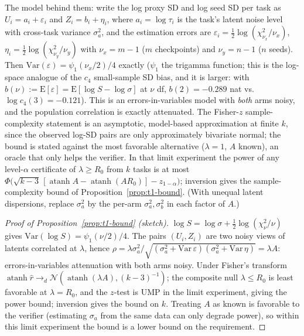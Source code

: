 The model behind
them: write the log proxy SD and log seed SD per task as $U_i = a_i + \varepsilon_i$ and
$Z_i = b_i + \eta_i$, where $a_i = \log \tau_i$ is the
task's latent noise level with cross-task variance $\sigma_a^2$, and the estimation errors are
$\varepsilon_i = \tfrac12\log(\chi^2_{\nu_x}/\nu_x)$, $\eta_i = \tfrac12\log(\chi^2_{\nu_y}/\nu_y)$
with $\nu_x = m-1$ ($m$ checkpoints) and $\nu_y = n-1$ ($n$ seeds). Then
$\mathrm{Var}(\varepsilon) = \psi_1(\nu_x/2)/4$ exactly ($\psi_1$ the trigamma function; this is
the log-space analogue of the $c_4$ small-sample SD bias, and it is larger:
with $b(\nu) := \mathrm{E}[\varepsilon] = \mathrm{E}[\log S - \log \sigma]$ at $\nu$ df, $b(2) = -0.289$ nat vs.\ $\log c_4(3) = -0.121$). This is an errors-in-variables model with
\emph{both} arms noisy, and the population correlation is exactly attenuated. The Fisher-$z$
sample-complexity statement is an asymptotic, model-based approximation at finite $k$, since the
observed log-SD pairs are only approximately bivariate normal; the bound is stated against the
most favorable alternative ($\lambda = 1$, $A$ known), an oracle that only helps the verifier.
In that limit experiment the power of any level-$\alpha$ certificate of $\lambda \ge R_0$ from
$k$ tasks is at most
$\Phi\!\bigl(\sqrt{k-3}\,[\operatorname{atanh} A - \operatorname{atanh}(A R_0)] -
z_{1-\alpha}\bigr)$; inversion gives the sample-complexity bound of
Proposition~\ref{prop:t1-bound}. (With unequal latent dispersions, replace $\sigma_a^2$ by the
per-arm $\sigma_a^2, \sigma_b^2$ in each factor of $A$.)

\begin{proof}[Proof of Proposition~\ref{prop:t1-bound} (sketch)]
$\log S = \log\sigma + \tfrac12\log(\chi^2_\nu/\nu)$ gives $\mathrm{Var}(\log S) = \psi_1(\nu/2)/4$.
The pairs $(U_i, Z_i)$ are two noisy views of latents correlated at $\lambda$, hence
$\rho = \lambda\sigma_a^2/\sqrt{(\sigma_a^2 + \mathrm{Var}\,\varepsilon)(\sigma_a^2 +
\mathrm{Var}\,\eta)} = \lambda A$: errors-in-variables attenuation \citep{spearman1904} with both arms noisy. Under Fisher's transform
$\operatorname{atanh}\hat r \to_d \mathcal N(\operatorname{atanh}(\lambda A), (k-3)^{-1})$; the
composite null $\lambda \le R_0$ is least favorable at $\lambda = R_0$, and the $z$-test is UMP in
the limit experiment, giving the power bound; inversion gives the bound on $k$. Treating $A$ as
known is favorable to the verifier (estimating $\sigma_a$ from the same data can only degrade
power), so within this limit experiment the bound is a lower bound on the requirement.
\end{proof}

